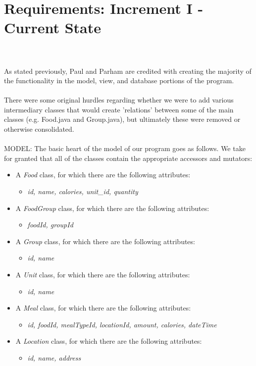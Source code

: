 \documentclass{article}
\begin{document}
\section{Requirements: Increment I - Current State}
\\\\
As stated previously, Paul and Parham are credited with creating the majority of the functionality in the model, view, and database portions of the program. 
\\\\
There were some original hurdles regarding whether we were to add various intermediary classes that would create 'relations' between some of the main classes (e.g. Food.java and Group.java), but ultimately these were removed or otherwise consolidated.
\\\\
MODEL: The basic heart of the model of our program goes as follows. We take for granted that all of the classes contain the appropriate accessors and mutators:
\\
\begin{itemize}
    \item A \textit{Food} class, for which there are the following attributes: 
        \begin{itemize}
        \item \textit{id, name, calories, unit\_id, quantity}
        \end{itemize}
    \item A \textit{FoodGroup} class, for which there are the following attributes: 
        \begin{itemize}
        \item \textit{foodId, groupId}
        \end{itemize}
    \item A \textit{Group} class, for which there are the following attributes: 
        \begin{itemize}
            \item \textit{id, name}
        \end{itemize}
    \item A \textit{Unit} class, for which there are the following attributes: 
        \begin{itemize}
            \item \textit{id, name}
        \end{itemize}
    \item A \textit{Meal} class, for which there are the following attributes: 
        \begin{itemize}
            \item \textit{id, foodId, mealTypeId, locationId, amount, calories, dateTime}
        \end{itemize}
    \item A \textit{Location} class, for which there are the following attributes: 
        \begin{itemize}
            \item \textit{id, name, address}\\
        \end{itemize}
\end{itemize}
\end{document}
